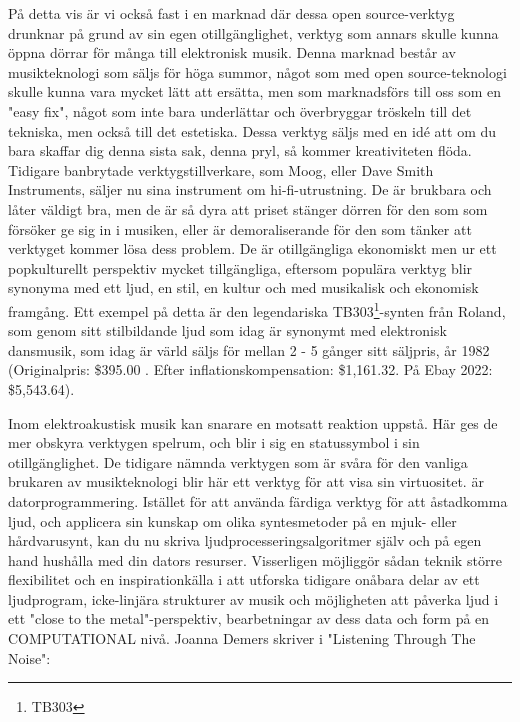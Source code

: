 \documentclass{article}
\begin{document}
På detta vis är vi också fast i en marknad där dessa open source-verktyg drunknar på grund av sin egen
otillgänglighet, verktyg som annars skulle kunna öppna dörrar för många till elektronisk musik. Denna
marknad består av musikteknologi som säljs för höga summor, något som med open source-teknologi skulle kunna
vara mycket lätt att ersätta, men som marknadsförs till oss som en "easy fix", något som inte bara
underlättar och överbryggar tröskeln till det tekniska, men också till det estetiska. Dessa verktyg
säljs med en idé att om du bara skaffar dig denna sista sak, denna pryl, så kommer kreativiteten flöda.
Tidigare banbrytade verktygstillverkare, som Moog, eller Dave Smith Instruments, säljer nu sina instrument
om hi-fi-utrustning. De är brukbara och låter väldigt bra, men de är så dyra att priset stänger dörren för
den som som försöker ge sig in i musiken, eller är demoraliserande för den som tänker att verktyget kommer
lösa dess problem. De är otillgängliga ekonomiskt men ur ett popkulturellt perspektiv mycket tillgängliga,
eftersom populära verktyg blir synonyma med ett ljud, en stil, en kultur och med musikalisk och ekonomisk
framgång. Ett exempel på detta är den legendariska TB303\footnote{TB303}-synten från Roland, som genom sitt
stilbildande ljud som idag är synonymt med elektronisk dansmusik, som idag är värld säljs för mellan 2 - 5
gånger sitt säljpris, år 1982 (Originalpris: \$395.00 . Efter inflationskompensation: \$1,161.32. På Ebay
2022: \$5,543.64).



Inom elektroakustisk musik kan snarare en motsatt reaktion uppstå. Här ges de mer obskyra verktygen spelrum,
och blir i sig en statussymbol i sin otillgänglighet. De tidigare nämnda verktygen som är svåra för den
vanliga brukaren av musikteknologi blir här ett verktyg för att visa sin virtuositet. 
är datorprogrammering. 
Istället för att använda färdiga verktyg för att åstadkomma ljud, och applicera sin kunskap om olika
syntesmetoder på en mjuk- eller hårdvarusynt, kan du nu skriva ljudprocesseringsalgoritmer själv och på egen
hand hushålla med din dators resurser. Visserligen möjliggör sådan teknik större flexibilitet och en
inspirationkälla i att utforska tidigare onåbara delar av ett ljudprogram, icke-linjära strukturer av musik
och möjligheten att påverka ljud i ett "close to the metal"-perspektiv, bearbetningar av dess data och form
på en COMPUTATIONAL nivå.
Joanna Demers skriver i "Listening Through The Noise":
\end{document}
